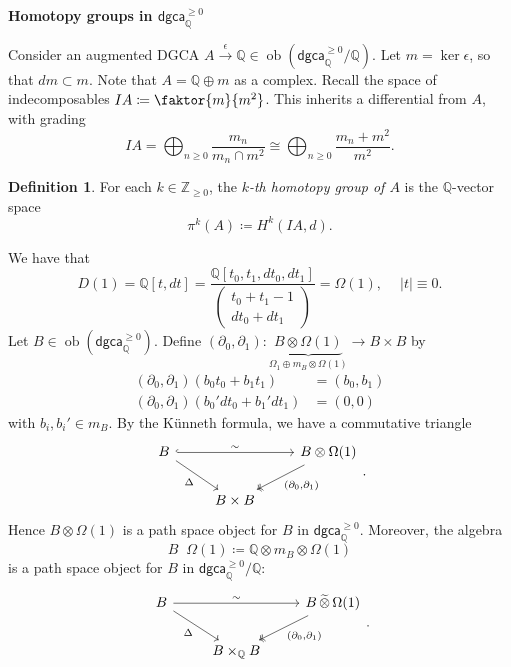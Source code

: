 \documentclass[10pt,letterpaper,cm]{nupset}
\theoremstyle{definition}
\newtheorem{defn}{Definition}[subsection]
\theoremstyle{theorem}
\theoremstyle{remark}
\newcommand{\Q}{\mathbb Q}
\newcommand{\Z}{\mathbb Z}
\newcommand{\1}{\mathbb{1}}
\newcommand{\dgca}{\mathsf{dgca}}
\newcommand{\0}{\vec 0}
\DeclareMathOperator{\wotimes}{\mathbin{\widetilde{\otimes}}}
\DeclareMathOperator{\ob}{ob}
\begin{document}
\medskip


\textbf{Homotopy groups in $\dgca_{\Q}^{\geq0}$}

\medskip

Consider an augmented  DGCA $A \xrightarrow{\epsilon} \Q \in \ob(\dgca_{\Q}^{\geq 0}/\Q)$. Let $m = \ker{\epsilon}$, so that $d{m} \subset m$. Note that $A = \Q \oplus m$ as a complex. Recall the space of indecomposables $I{A} \coloneqq \faktor{m}{m^2}$. This inherits a differential from $A$, with grading
\[
I{A} = \bigoplus_{n \geq 0} \frac{m_n}{m_n \cap m^2} \cong \bigoplus_{n \geq 0} \frac{m_n + m^2}{m^2} 
.\]

\begin{defn}
For each $k \in \Z_{\geq 0}$, the \textit{$k$-th homotopy group of $A$} is the $\Q$-vector space
\[
\pi^k(A) \coloneqq H^k(I{A},d)
.\]
\end{defn}

We have that 
\[
    D(1) =  \Q\left[t, d{t}\right] =
  \frac{\Q\left[t_0, t_1, d{t_0}, d{t_1}\right]}{\left(\substack{t_0 + t_1 -1 \\ d{t_0} +d{t_1}}\right)} 
  = \Omega(1), \ \quad \left\lvert{t}\right\rvert \equiv 0.\]
  Let $B \in \ob(\dgca_{\Q}^{\geq 0})$. Define $\left(\partial_0, \partial_1\right) : \underbrace{B \otimes \Omega(1)}_{ \Omega_1 \oplus m_B \otimes \Omega(1)}  \to B \times B$ by  
  \begin{align*}
  \left(\partial_0, \partial_1\right)(b_0t_0 + b_1t_1) & =  \left(b_0, b_1\right)
  \\   \left(\partial_0, \partial_1\right)(b_0'd{t_0} + b_1'd{t_1}) & =  \left(0, 0\right)
  \end{align*} with $b_i, b_i' \in m_B$.
  By the K\"unneth formula, we have a commutative triangle
  \[
\begin{tikzcd}
	B & {} & {B\otimes \Omega(1)} \\
	& {B\times B}
	\arrow["\Delta"', from=1-1, to=2-2]
	\arrow["{\left(\partial_0, \partial_1\right)}", two heads, from=1-3, to=2-2]
	\arrow["\sim", hook, from=1-1, to=1-3]
\end{tikzcd}
  .\] Hence $B \otimes \Omega(1)$ is a path space object for $B$ in $\dgca_{\Q}^{\geq 0}$. Moreover, the algebra
  \[
  B \wotimes \Omega(1) \coloneqq \Q \otimes m_B \otimes \Omega(1)
\] is a path space object for $B$ in $\dgca_{\Q}^{\geq 0}/\Q$:
\[
\begin{tikzcd}
	B & {} & {B\wotimes \Omega(1)} \\
	& {B\times_{\Q} B}
	\arrow["\Delta"', from=1-1, to=2-2]
	\arrow["{\left(\partial_0, \partial_1\right)}", two heads, from=1-3, to=2-2]
	\arrow["\sim", from=1-1, to=1-3]
\end{tikzcd}
.\]
\end{document}
